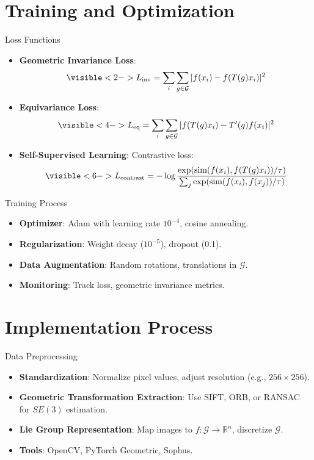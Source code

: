 \documentclass{beamer}
\begin{document}
\section{Training and Optimization}
\begin{frame}{Loss Functions}
  \begin{itemize}
    \item<1-> \textbf{Geometric Invariance Loss}:
      \[
      \visible<2->{L_{\text{inv}} = \sum_i \sum_{g \in \mathcal{G}} | f(x_i) - f(T(g) x_i) |^2}
      \]
    \item<3-> \textbf{Equivariance Loss}:
      \[
      \visible<4->{L_{\text{eq}} = \sum_i \sum_{g \in \mathcal{G}} | f(T(g) x_i) - T'(g) f(x_i) |^2}
      \]
    \item<5-> \textbf{Self-Supervised Learning}: Contrastive loss:
      \[
      \visible<6->{L_{\text{contrast}} = -\log \frac{\exp(\text{sim}(f(x_i), f(T(g) x_i)) / \tau)}{\sum_j \exp(\text{sim}(f(x_i), f(x_j)) / \tau)}}
      \]
  \end{itemize}
\end{frame}

\begin{frame}{Training Process}
  \begin{itemize}
    \item<1-> \textbf{Optimizer}: Adam with learning rate $10^{-4}$, cosine annealing.
    \item<2-> \textbf{Regularization}: Weight decay ($10^{-5}$), dropout (0.1).
    \item<3-> \textbf{Data Augmentation}: Random rotations, translations in $\mathcal{G}$.
    \item<4-> \textbf{Monitoring}: Track loss, geometric invariance metrics.
  \end{itemize}
  \begin{center}
  \end{center}
\end{frame}

\section{Implementation Process}
\begin{frame}{Data Preprocessing}
  \begin{itemize}
    \item<1-> \textbf{Standardization}: Normalize pixel values, adjust resolution (e.g., $256 \times 256$).
    \item<2-> \textbf{Geometric Transformation Extraction}: Use SIFT, ORB, or RANSAC for $SE(3)$ estimation.
    \item<3-> \textbf{Lie Group Representation}: Map images to $f: \mathcal{G} \to \mathbb{R}^n$, discretize $\mathcal{G}$.
    \item<4-> \textbf{Tools}: OpenCV, PyTorch Geometric, Sophus.
  \end{itemize}
\end{frame}
\end{document}
